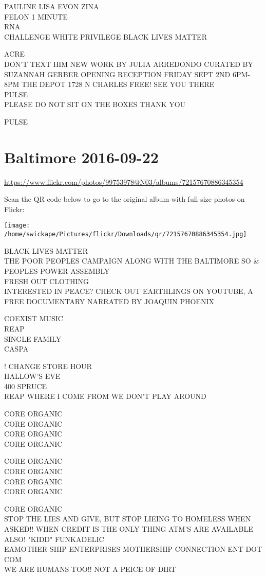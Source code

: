 \documentclass[10pt,letterpaper]{article}
\begin{document}
PAULINE LISA EVON ZINA\\
FELON 1 MINUTE\\
RNA\\
CHALLENGE WHITE PRIVILEGE BLACK LIVES MATTER

ACRE\\
DON'T TEXT HIM NEW WORK BY JULIA ARREDONDO CURATED BY SUZANNAH GERBER OPENING RECEPTION FRIDAY SEPT 2ND 6PM{-}8PM THE DEPOT 1728 N CHARLES FREE! SEE YOU THERE\\
PULSE\\
PLEASE DO NOT SIT ON THE BOXES THANK YOU

PULSE


\section*{Baltimore 2016-09-22}

\url{https://www.flickr.com/photos/99753978@N03/albums/72157670886345354}

Scan the QR code below to go to the original album with full-size photos on Flickr:

\texttt{[image: /home/swickape/Pictures/flickr/Downloads/qr/72157670886345354.jpg]}


BLACK LIVES MATTER\\
THE POOR PEOPLES CAMPAIGN ALONG WITH THE BALTIMORE SO \& PEOPLES POWER ASSEMBLY\\
FRESH OUT CLOTHING\\
INTERESTED IN PEACE?  CHECK OUT EARTHLINGS ON YOUTUBE, A FREE DOCUMENTARY NARRATED BY JOAQUIN PHOENIX

COEXIST MUSIC\\
REAP\\
SINGLE FAMILY\\
CASPA

! CHANGE STORE HOUR\\
HALLOW'S EVE\\
400 SPRUCE\\
REAP WHERE I COME FROM WE DON'T PLAY AROUND

CORE ORGANIC\\
CORE ORGANIC\\
CORE ORGANIC\\
CORE ORGANIC

CORE ORGANIC\\
CORE ORGANIC\\
CORE ORGANIC\\
CORE ORGANIC

CORE ORGANIC\\
STOP THE LIES AND GIVE, BUT STOP LIEING TO HOMELESS WHEN ASKED!! WHEN CREDIT IS THE ONLY THING ATM'S ARE AVAILABLE ALSO! "KIDD" FUNKADELIC\\
EAMOTHER SHIP ENTERPRISES MOTHERSHIP CONNECTION ENT DOT COM\\
WE ARE HUMANS TOO!! NOT A PEICE OF DIRT
\end{document}

